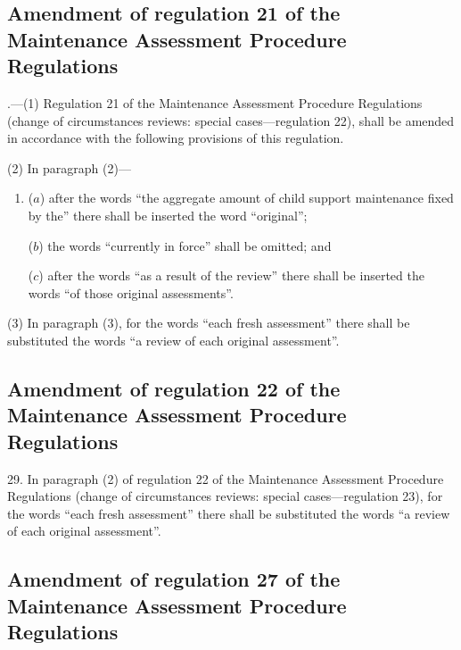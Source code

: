 \documentclass[12pt,a4paper]{article}
\begin{document}
\subsection[28. Amendment of regulation 21 of the Maintenance Assessment Procedure Regulations]{Amendment of regulation 21 of the Maintenance Assessment Procedure Regulations}

\begin{sloppypar}.—(1) Regulation 21 of the Maintenance Assessment Procedure Regulations (change of circumstances reviews: special cases—regulation 22), shall be amended in accordance with the following provisions of this regulation.
\end{sloppypar}

(2) In paragraph (2)—
\begin{enumerate}\item[]
($a$) after the words “the aggregate amount of child support maintenance fixed by the” there shall be inserted the word “original”;

($b$) the words “currently in force” shall be omitted; and

($c$) after the words “as a result of the review” there shall be inserted the words “of those original assessments”.
\end{enumerate}

(3) In paragraph (3), for the words “each fresh assessment” there shall be substituted the words “a review of each original assessment”.

\subsection[29. Amendment of regulation 22 of the Maintenance Assessment Procedure Regulations]{Amendment of regulation 22 of the Maintenance Assessment Procedure Regulations}

29.  In paragraph (2) of regulation 22 of the Maintenance Assessment Procedure Regulations (change of circumstances reviews: special cases—regulation 23), for the words “each fresh assessment” there shall be substituted the words “a review of each original assessment”.

\subsection[30. Amendment of regulation 27 of the Maintenance Assessment Procedure Regulations]{Amendment of regulation 27 of the Maintenance Assessment Procedure Regulations}
\end{document}
